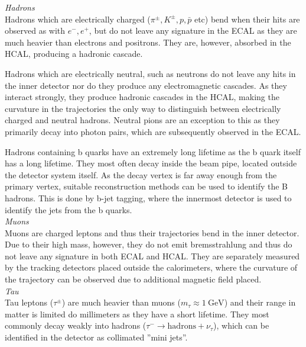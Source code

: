 \documentclass[a4paper]{report}
\numberwithin{equation}{section}
\begin{document}
 \noindent \textit{Hadrons} \\

 Hadrons which are electrically charged ($\pi^\pm, K^\pm, p, \bar{p}$ etc) bend when their hits are observed as with $e^-, e^+$, 
but do not leave any signature in the ECAL as they are much heavier than electrons and positrons. They are, however, absorbed in the HCAL, 
producing a hadronic cascade. \par 

Hadrons which are electrically neutral, such as neutrons do not leave any hits in the inner detector nor do they produce 
any electromagnetic cascades. As they interact strongly, they produce hadronic cascades in the HCAL, making the curvature in the trajectories
the only way to distinguish between electrically charged and neutral hadrons. Neutral pions are an exception to this as they primarily decay 
into photon pairs, which are subsequently observed in the ECAL. \par 

Hadrons containing b quarks have an extremely long lifetime as the b quark itself has a long lifetime. They most often decay inside the beam pipe, located 
outside the detector system itself. As the decay vertex is far away enough from the primary vertex, suitable reconstruction methods can be used to identify the 
B hadrons. This is done by b-jet tagging, where the innermost detector is used to identify the jets from the b quarks. \\

\noindent \textit{Muons} \\

Muons are charged leptons and thus their trajectories bend in the inner detector. Due to their high mass, however, they do not emit bremsstrahlung and thus 
do not leave any signature in both ECAL and HCAL. They are separately measured by the tracking detectors placed outside the calorimeters, where the curvature 
of the trajectory can be observed due to additional magnetic field placed. \\

\noindent \textit{Tau} \\

Tau leptons ($\tau^\pm$) are much heavier than muons ($m_\tau \approx \SI{1}{\giga\electronvolt}$) and their range in matter is limited do millimeters 
as they have a short lifetime. They most commonly decay weakly into hadrons ($\tau^- \rightarrow \mathrm{hadrons} + \nu_\tau$), which can be identified in the detector as collimated ''mini jets''. \\
\end{document}

